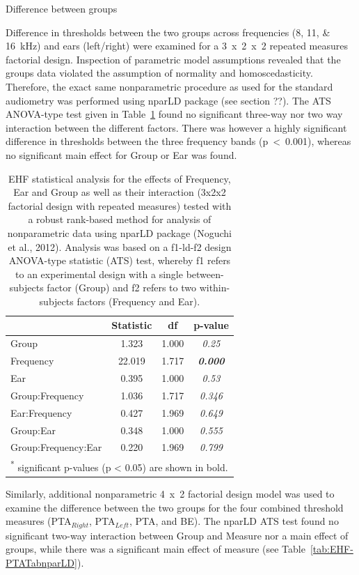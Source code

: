 \documentclass[a4paper, twoside]{templates/ociamthesis}
\begin{document}
\colorbox[HTML]{CCCCFF}{Difference between groups}

Difference in thresholds between the two groups across frequencies (8, 11, \& 16~kHz) and ears (left/right) were examined for a 3~x~2~x~2 repeated measures factorial design. Inspection of parametric model assumptions revealed that the groups data violated the assumption of normality and homoscedasticity. Therefore, the exact same nonparametric procedure as used for the standard audiometry was performed using nparLD package (see section ??). The ATS ANOVA-type test given in Table~\ref{tab:EHF-TabnparLD} found no significant three-way nor two way interaction between the different factors. There was however a highly significant difference in thresholds between the three frequency bands (p~\textless~0.001), whereas no significant main effect for Group or Ear was found.

\begin{table}

\caption{\label{tab:EHF-TabnparLD}EHF statistical analysis for the effects of Frequency, Ear and Group as well as their interaction (3x2x2 factorial design with repeated measures) tested with a robust rank-based method for analysis of nonparametric data using nparLD package (Noguchi et al., 2012). Analysis was based on a f1-ld-f2 design ANOVA-type statistic (ATS) test, whereby f1 refers to an experimental design with a single between-subjects factor (Group) and f2 refers to two within-subjects factors (Frequency and Ear).}
\centering
\begin{tabular}[t]{lcc>{}c}
\toprule
  & Statistic & df & p-value\\
\midrule
Group & 1.323 & 1.000 & \em{0.25}\\
Frequency & 22.019 & 1.717 & \em{\textbf{0.000}}\\
Ear & 0.395 & 1.000 & \em{0.53}\\
Group:Frequency & 1.036 & 1.717 & \em{0.346}\\
Ear:Frequency & 0.427 & 1.969 & \em{0.649}\\
Group:Ear & 0.348 & 1.000 & \em{0.555}\\
Group:Frequency:Ear & 0.220 & 1.969 & \em{0.799}\\
\bottomrule
\multicolumn{4}{l}{\textsuperscript{*} significant p-values (p < 0.05) are shown in bold.}\\
\end{tabular}
\end{table}

Similarly, additional nonparametric 4~x~2 factorial design model was used to examine the difference between the two groups for the four combined threshold measures (PTA\(_{Right}\), PTA\(_{Left}\), PTA, and BE). The nparLD ATS test found no significant two-way interaction between Group and Measure nor a main effect of groups, while there was a significant main effect of measure (see Table~\ref{tab:EHF-PTATabnparLD}).
\end{document}
